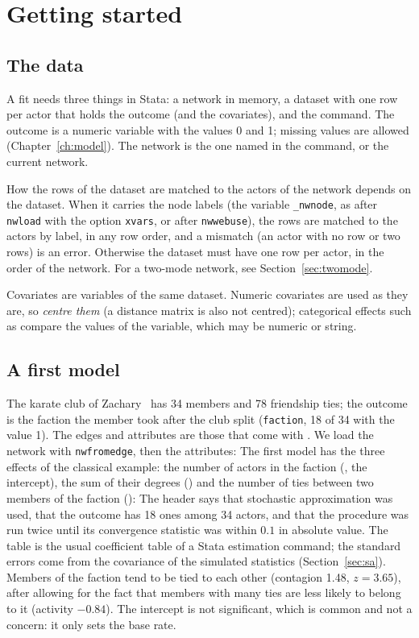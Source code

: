 \chapter{Getting started}\label{ch:start}

\section{The data}\label{sec:data}

A fit needs three things in Stata: a network in memory, a dataset with one row per actor that holds the outcome (and the covariates), and the command. The outcome is a numeric variable with the values 0 and 1; missing values are allowed (Chapter~\ref{ch:model}). The network is the one named in the command, or the current network.

How the rows of the dataset are matched to the actors of the network depends on the dataset. When it carries the node labels (the variable \texttt{\_nwnode}, as after \texttt{nwload} with the option \texttt{xvars}, or after \texttt{nwwebuse}), the rows are matched to the actors by label, in any row order, and a mismatch (an actor with no row or two rows) is an error. Otherwise the dataset must have one row per actor, in the order of the network. For a two-mode network, see Section~\ref{sec:twomode}.

Covariates are variables of the same dataset. Numeric covariates are used as they are, so \emph{centre them} (a distance matrix is also not centred); categorical effects such as  compare the values of the variable, which may be numeric or string.

\section{A first model}\label{sec:first}

The karate club of Zachary~\cite{zachary1977} has 34 members and 78 friendship ties; the outcome is the faction the member took after the club split (\texttt{faction}, 18 of 34 with the value 1). The edges and attributes are those that come with \alaamee{}. We load the network with \texttt{nwfromedge}, then the attributes:
The first model has the three effects of the classical example: the number of actors in the faction (, the intercept), the sum of their degrees () and the number of ties between two members of the faction ():
The header says that stochastic approximation was used, that the outcome has 18 ones among 34 actors, and that the procedure was run twice until its convergence statistic was within $0.1$ in absolute value. The table is the usual coefficient table of a Stata estimation command; the standard errors come from the covariance of the simulated statistics (Section~\ref{sec:sa}). Members of the faction tend to be tied to each other (contagion 1.48, $z=3.65$), after allowing for the fact that members with many ties are less likely to belong to it (activity $-0.84$). The intercept is not significant, which is common and not a concern: it only sets the base rate.

